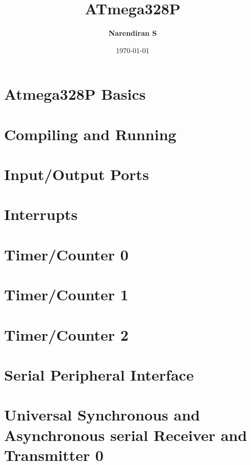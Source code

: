 \documentclass[oneside]{book}
\title{\Huge \textbf{ATmega328P}}
\author{\textbf{Narendiran S}}
\date{\today}
\begin{document}
\maketitle

\tableofcontents

\chapter{Atmega328P Basics}



\chapter{Compiling and Running}


\chapter{Input/Output Ports}


\chapter{Interrupts}



\chapter{Timer/Counter 0}


\chapter{Timer/Counter 1}


\chapter{Timer/Counter 2}


\chapter{Serial Peripheral Interface}


\chapter{Universal Synchronous and Asynchronous serial Receiver and Transmitter 0}

\end{document}
